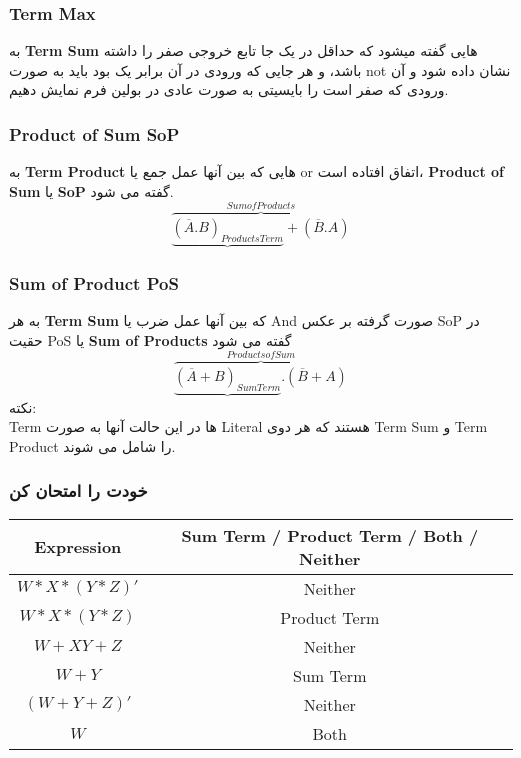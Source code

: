 \documentclass[pt, a5paper]{article}
\begin{document}
\subsubsection{Term Max}
به \textbf{Term Sum } هایی گفته میشود که حداقل در یک جا تابع خروجی صفر را داشته باشد، و هر جایی که ورودی در آن برابر یک بود باید به صورت not نشان داده شود و آن ورودی که صفر است را بایسیتی به صورت عادی در بولین فرم نمایش دهیم.

\raggedleft
\justifying
\subsubsection{Product of Sum SoP}
	به \textbf{Term Product }هایی که بین آنها عمل جمع یا or اتفاق افتاده است، \textbf{Product of Sum }یا \textbf{SoP} گفته می شود.\\

\begin{equation}
	\overbrace{\underbrace{(\overline{A}.B)_{Products Term}} + (\overline{B}.A)}^{Sum of Products}
\end{equation}

\subsubsection{Sum of Product PoS}
	به هر \textbf{Term Sum} که بین آنها عمل ضرب یا And صورت گرفته بر عکس	 SoP در حقیت PoS یا\textbf{ Sum of Products }گفته می شود\\
\begin{equation}
	\overbrace{\underbrace{(\overline{A}+B)_{Sum Term}} . (\overline{B}+A)}^{Products of Sum}
\end{equation}
نکته:\\

	Term
ها
در این حالت آنها به صورت Literal هستند که هر دوی Term Sum و Term Product را شامل می شوند.

\newpage

\subsubsection{خودت را امتحان کن}
\center
\begin{LTR}
	\begin{tabular}{ c | c}
		Expression & Sum Term / Product Term / Both / Neither \\
		\hline
		$W*X*(Y*Z)'$ & Neither\\
		$W*X*(Y*Z)$ & Product Term\\
		$W+XY+Z$ & Neither\\
		$W+Y$ & Sum Term\\
		$(W+Y+Z)'$ & Neither\\
		$W$ & Both\\
	\end{tabular}

\end{LTR}
\end{document}
